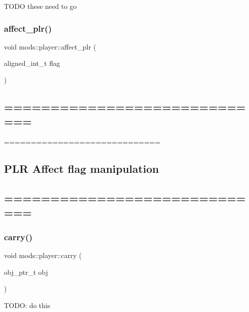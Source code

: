 T\+O\+DO these need to go \mbox{\label{classmods_1_1player_acd374d4b3b772201c0ec8611fbbc9c4a}} 
\subsubsection{\texorpdfstring{affect\+\_\+plr()}{affect\_plr()}}
{\footnotesize\ttfamily void mods\+::player\+::affect\+\_\+plr (\begin{DoxyParamCaption}\item[{aligned\+\_\+int\+\_\+t}]{flag }\end{DoxyParamCaption})}

\subsection*{============================= }

============================= \subsection*{P\+LR Affect flag manipulation }

\subsection*{============================= }\mbox{\label{classmods_1_1player_a3dfd0e5a7bb17c98cfa5031b02620cbb}} 
\subsubsection{\texorpdfstring{carry()}{carry()}}
{\footnotesize\ttfamily void mods\+::player\+::carry (\begin{DoxyParamCaption}\item[{obj\+\_\+ptr\+\_\+t}]{obj }\end{DoxyParamCaption})}

T\+O\+DO\+: do this \mbox{\label{classmods_1_1player_af85ed0368fd327f3747b4d1e6572cccc}} 
